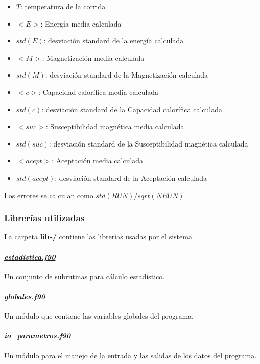\begin{itemize}
  \item $T$: temperatura de la corrida 
    \item $<E>$: Energ\'ia media calculada
    \item  $std(E)$: desviaci\'on standard de la energ\'ia calculada

    \item $<M>$: Magnetizaci\'on media calculada
    \item  $std(M)$: desviaci\'on standard de la Magnetizaci\'on calculada


    \item $<c>$: Capacidad calor\'ifica media calculada
    \item  $std(c)$: desviaci\'on standard de la Capacidad calor\'ifica calculada

    \item $<suc>$: Susceptibilidad magn\'etica media calculada
    \item  $std(suc)$: desviaci\'on standard de la Susceptibilidad magn\'etica calculada


    \item $<acept>$: Aceptaci\'on media calculada
    \item  $std(acept)$: desviaci\'on standard de la Aceptaci\'on calculada
\end{itemize}



  Los errores se calculan como $std(RUN)/sqrt(NRUN)$


\subsubsection{Librer\'ias utilizadas}

La carpeta \textbf{libs/} contiene las librer\'ias usadas por el sistema

\paragraph{\underline{\textit{estadistica.f90}}}

Un conjunto de subrutinas para c\'alculo estad\'istico. 

\paragraph{\underline{\textit{globales.f90}}}
Un m\'odulo que contiene las variables globales del programa.
	
\paragraph{\underline{\textit{io\_parametros.f90}}}  
Un m\'odulo para el manejo de la entrada y las salidas de los
datos del programa.


